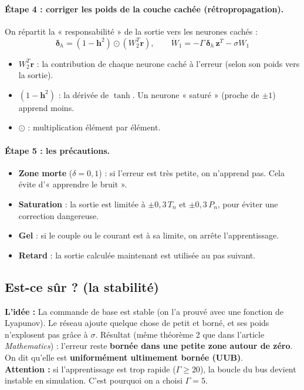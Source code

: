 \documentclass[11pt,a4paper]{article}
\newcommand{\bv}[1]{\boldsymbol{#1}}
\newcommand{\Idee}{\textbf{L'idée : }}
\begin{document}
\paragraph{Étape 4 : corriger les poids de la couche cachée (rétropropagation).}
On répartit la « responsabilité » de la sortie vers les neurones cachés :
\begin{equation}
\bv{\delta}_h = (1-\bv{h}^2)\odot(W_2^T\bv{r}),\qquad \dot W_1 = -\Gamma\,\bv{\delta}_h\,\bv{z}^T - \sigma W_1
\end{equation}
\begin{itemize}
\item $W_2^T\bv{r}$ : la contribution de chaque neurone caché à l'erreur (selon son poids vers la sortie).
\item $(1-\bv{h}^2)$ : la dérivée de $\tanh$. Un neurone « saturé » (proche de $\pm1$) apprend moins.
\item $\odot$ : multiplication élément par élément.
\end{itemize}

\paragraph{Étape 5 : les précautions.}
\begin{itemize}
\item \textbf{Zone morte} ($\delta = 0{,}1$) : si l'erreur est très petite, on n'apprend pas. Cela évite
d'« apprendre le bruit ».
\item \textbf{Saturation} : la sortie est limitée à $\pm 0{,}3\,T_n$ et $\pm 0{,}3\,P_n$, pour éviter une correction dangereuse.
\item \textbf{Gel} : si le couple ou le courant est à sa limite, on arrête l'apprentissage.
\item \textbf{Retard} : la sortie calculée maintenant est utilisée au pas suivant.
\end{itemize}

\subsection{Est-ce sûr ? (la stabilité)}
\begin{idee}
\Idee
La commande de base est stable (on l'a prouvé avec une fonction de Lyapunov). Le réseau ajoute quelque chose
de petit et borné, et ses poids n'explosent pas grâce à $\sigma$. Résultat (même théorème 2 que dans l'article
\emph{Mathematics}) : l'erreur reste \textbf{bornée dans une petite zone autour de zéro}. On dit qu'elle est
\textbf{uniformément ultimement bornée (UUB)}.\\
\textbf{Attention :} si l'apprentissage est trop rapide ($\Gamma\ge 20$), la boucle du bus devient instable en
simulation. C'est pourquoi on a choisi $\Gamma = 5$.
\end{idee}
\end{document}
